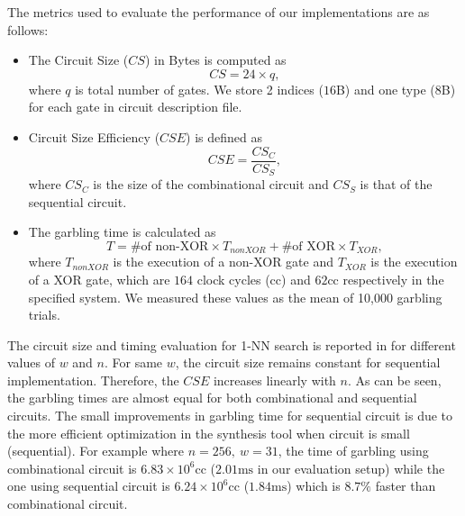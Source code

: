 The metrics used to evaluate the performance of our implementations are as follows:
\begin{itemize}
  \item The Circuit Size ($\mathit{CS}$) in Bytes is computed as $$\mathit{CS} = 24\times q, $$ where $q$ is total number of gates.
We store 2 indices ($16$B) and one type ($8$B) for each gate in circuit description file.

  \item Circuit Size Efficiency ($\mathit{CSE}$) is defined as $$\mathit{CSE} = \dfrac{\mathit{CS}_{C}}{\mathit{CS}_{S}}, $$ where $\mathit{CS}_{C}$ is the size of the combinational circuit and $\mathit{CS}_{S}$ is that of the sequential circuit.

  \item The garbling time is calculated as $$\mathit{T} = \text{\# of non-XOR} \times \mathit{T_{nonXOR}} + \text{\# of XOR} \times \mathit{T_\text{XOR}},$$ where $\mathit{T_{nonXOR}}$ is the execution of a non-XOR gate and $\mathit{T_\text{XOR}}$ is the execution of a XOR gate, which are $164$ clock cycles (cc) and $62$cc respectively in the specified system.
We measured these values as the mean of 10,000 garbling trials.
\end{itemize}

The circuit size and timing evaluation for 1-NN search is reported in  for different values of $w$ and $n$.
For same $w$, the circuit size remains constant for sequential implementation.
Therefore, the $\mathit{CSE}$ increases linearly with $n$.
As can be seen, the garbling times are almost equal for both combinational and sequential circuits.
The small improvements in garbling time for sequential circuit is due to the more efficient optimization in the synthesis tool when circuit is small (sequential).
For example where $n=256,~w=31$, the time of garbling using combinational circuit is $6.83\times 10^6\text{cc}$ ($2.01\text{ms}$ in our evaluation setup) while the one using sequential circuit is $6.24\times 10^6\text{cc}$ ($1.84\text{ms}$) which is $8.7\%$ faster than combinational circuit.

